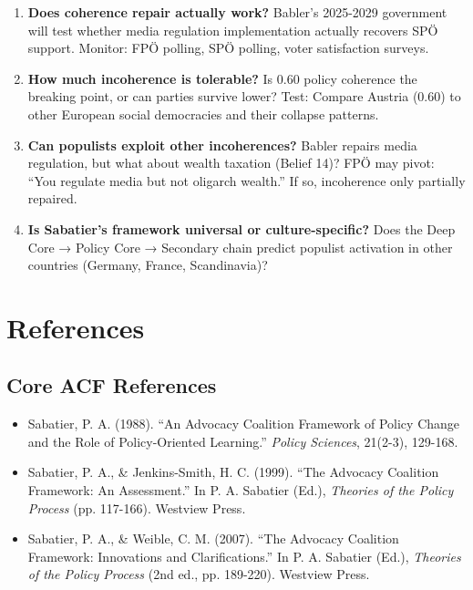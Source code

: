 \begin{enumerate}

\item \textbf{Does coherence repair actually work?} Babler's 2025-2029 government will test whether media regulation implementation actually recovers SPÖ support. Monitor: FPÖ polling, SPÖ polling, voter satisfaction surveys.

\item \textbf{How much incoherence is tolerable?} Is 0.60 policy coherence the breaking point, or can parties survive lower? Test: Compare Austria (0.60) to other European social democracies and their collapse patterns.

\item \textbf{Can populists exploit other incoherences?} Babler repairs media regulation, but what about wealth taxation (Belief 14)? FPÖ may pivot: ``You regulate media but not oligarch wealth.'' If so, incoherence only partially repaired.

\item \textbf{Is Sabatier's framework universal or culture-specific?} Does the Deep Core → Policy Core → Secondary chain predict populist activation in other countries (Germany, France, Scandinavia)?

\end{enumerate}


\section{References}
\label{sec:cj-references}

\subsection{Core ACF References}

\begin{itemize}[nosep]
\item Sabatier, P. A. (1988). ``An Advocacy Coalition Framework of Policy Change and the Role of Policy-Oriented Learning.'' \textit{Policy Sciences}, 21(2-3), 129-168.

\item Sabatier, P. A., \& Jenkins-Smith, H. C. (1999). ``The Advocacy Coalition Framework: An Assessment.'' In P. A. Sabatier (Ed.), \textit{Theories of the Policy Process} (pp. 117-166). Westview Press.

\item Sabatier, P. A., \& Weible, C. M. (2007). ``The Advocacy Coalition Framework: Innovations and Clarifications.'' In P. A. Sabatier (Ed.), \textit{Theories of the Policy Process} (2nd ed., pp. 189-220). Westview Press.

\end{itemize}

